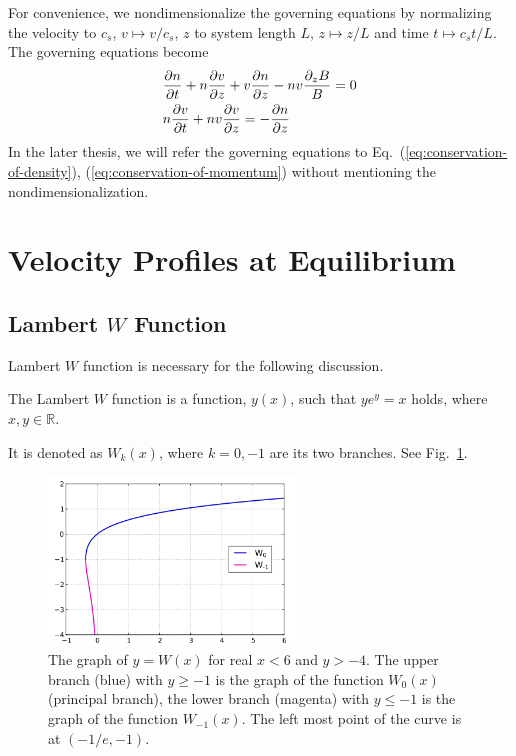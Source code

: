 For convenience, we nondimensionalize the governing equations by normalizing the velocity to $c_s$, $v\mapsto v/c_s$, $z$ to system length $L$, $z \mapsto z/L$ and time $t\mapsto c_s t/L$. The governing equations become
\begin{align}
	 & \pdv{n}{t} + n\pdv{v}{z} + v\pdv{n}{z} - nv\frac{\partial_z B}{B} = 0
	\label{eq:conservation-of-density}
	\\
	 & n\pdv{v}{t} + nv\pdv{v}{z} = -\pdv{n}{z}
	\label{eq:conservation-of-momentum}
\end{align}
In the later thesis, we will refer the governing equations to Eq.~(\ref{eq:conservation-of-density}), (\ref{eq:conservation-of-momentum}) without mentioning the nondimensionalization.

\section{Velocity Profiles at Equilibrium}
\subsection{Lambert $W$ Function}
Lambert $W$ function is necessary for the following discussion.
\begin{definition}
	The Lambert $W$ function is a function, $y(x)$, such that $ye^y = x$ holds, where $x,y\in\mathbb{R}$.
\end{definition}
It is denoted as $W_k(x)$, where $k = 0,-1$ are its two branches. See Fig.~\ref{fig:lambert-w}.
\begin{figure} [htbp]
	\centering
	\includegraphics[width=0.6\textwidth]{figures/lambert-w.png}
	\caption{The graph of $y=W(x)$ for real $x<6$ and $y>-4$. The upper branch (blue) with $y\geq-1$ is the graph of the function $W_0(x)$ (principal branch), the lower branch (magenta) with $y\leq -1$ is the graph of the function $W_{-1}(x)$. The left most point of the curve is at $(-1/e,-1)$.}
	\label{fig:lambert-w}
\end{figure}

